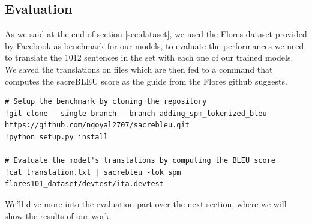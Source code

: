 \subsection{Evaluation}
As we said at the end of section \ref{sec:dataset}, we used the Flores dataset \cite{goyal2021flores} provided by Facebook as benchmark for our models, to evaluate the performances we need to translate the 1012 sentences in the set with each one of our trained models. We saved the translations on files which are then fed to a command that computes the sacreBLEU score as the guide from the Flores github suggests.
\begin{verbatim}
# Setup the benchmark by cloning the repository
!git clone --single-branch --branch adding_spm_tokenized_bleu https://github.com/ngoyal2707/sacrebleu.git
!python setup.py install

# Evaluate the model's translations by computing the BLEU score
!cat translation.txt | sacrebleu -tok spm flores101_dataset/devtest/ita.devtest
\end{verbatim}
We'll dive more into the evaluation part over the next section, where we will show the results of our work.